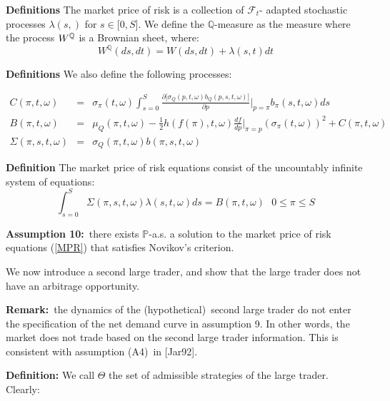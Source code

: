 \documentclass{article}
\begin{document}
\bigskip

\textbf{Definitions} The market price of risk is a collection of $\mathcal{F}%
_{t}$- adapted stochastic processes $\lambda (s,)$ for $s\in \lbrack 0,S]$.
We define the $\mathbb{Q}$-measure as the measure where the process $W^{%
\mathbb{Q}}$ is a Brownian sheet, where:%
\begin{equation}
W^{\mathbb{Q}}(ds,dt)=W(ds,dt)+\lambda (s,t)dt  \label{WQ}
\end{equation}

\textbf{Definitions }We also define the following processes:

\begin{eqnarray*}
C(\pi ,t,\omega ) &=&\sigma _{\pi }(t,\omega )\int_{s=0}^{S}\frac{\partial
\lbrack \sigma _{Q}(p,t,\omega )b_{Q}(p,s,t,\omega )]}{\partial p}|_{p=\pi
}b_{\pi }(s,t,\omega )ds \\
B(\pi ,t,\omega ) &=&\mu _{Q}(\pi ,t,\omega )-\frac{1}{2}h(f(\pi ),t,\omega )%
\frac{df}{dp}|_{\pi =p}(\sigma _{\pi }(t,\omega ))^{2}+C(\pi ,t,\omega ) \\
\Sigma (\pi ,s,t,\omega ) &=&\sigma _{Q}(\pi ,t,\omega )b(\pi ,s,t,\omega )
\end{eqnarray*}

\textbf{Definition }The market price of risk equations consist of the
uncountably infinite system of equations:
\begin{equation}
\int_{s=0}^{S}\Sigma (\pi ,s,t,\omega )\lambda (s,t,\omega )ds=B(\pi
,t,\omega )\text{ \ \ \ \ \ }0\leq \pi \leq S  \label{MPR}
\end{equation}

\textbf{Assumption 10:}\ there exists $\mathbb{P}$-a.s. a solution to the
market price of risk equations (\ref{MPR}) that satisfies Novikov's
criterion.

\bigskip

We now introduce a second large trader, and show that the large trader does
not have an arbitrage opportunity.

\bigskip

\textbf{Remark:}\ the dynamics of the (hypothetical)\ second large trader do
not enter the specification of the net demand curve in assumption 9. In
other words, the market does not trade based on the second large trader
information. This is consistent with assumption (A4)\ in [Jar92].

\bigskip

\textbf{Definition:} We call $\Theta $ the set of admissible strategies of
the large trader. Clearly:
\end{document}
